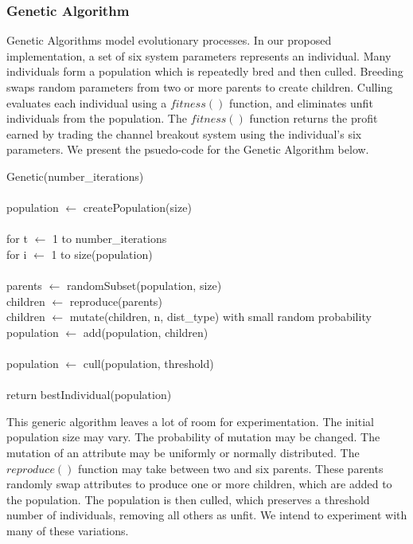 \documentclass[12pt]{article}
\begin{document}
\subsubsection{Genetic Algorithm}

Genetic Algorithms model evolutionary processes.  In our proposed
implementation, a set of six system parameters represents an individual.  Many
individuals form a population which is repeatedly bred and then culled.
Breeding swaps random parameters from two or more parents to create children.
Culling evaluates each individual using a $fitness()$ function, and eliminates
unfit individuals from the population.  The $fitness()$ function returns the
profit earned by trading the channel breakout system using the individual's six
parameters.  We present the psuedo-code for the Genetic Algorithm below.

\vspace{10pt}
\setlength{\parindent}{5mm}
\indent Genetic(number\_iterations)\\\\
\indent\indent population $\leftarrow$ createPopulation(size)\\\\
\indent \indent for t $\leftarrow$ 1 to number\_iterations\\
\indent \indent \indent for i $\leftarrow$ 1 to size(population)\\\\
\indent \indent \indent \indent parents $\leftarrow$ randomSubset(population, size)\\
\indent \indent \indent \indent children $\leftarrow$ reproduce(parents)\\
\indent \indent \indent \indent children $\leftarrow$ mutate(children, n, dist\_type) with small random probability\\
\indent \indent \indent \indent population $\leftarrow$ add(population, children)\\\\
\indent \indent \indent population $\leftarrow$ cull(population, threshold)\\\\
\indent \indent return bestIndividual(population)\\
\setlength{\parindent}{0mm}

This generic algorithm leaves a lot of room for experimentation. The initial
population size may vary.  The probability of mutation may be changed.  The
mutation of an attribute may be uniformly or normally distributed.  The
$reproduce()$ function may take between two and six parents.  These parents
randomly swap attributes to produce one or more children, which are added to
the population.  The population is then culled, which preserves a threshold
number of individuals, removing all others as unfit. We intend to experiment
with many of these variations.
\end{document}
